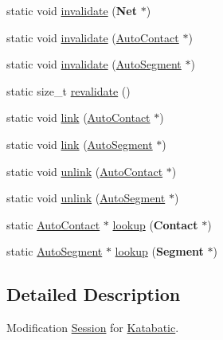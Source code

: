 \begin{DoxyCompactItemize}
\item 
static void \hyperlink{classKatabatic_1_1Session_ae310a7c2c301b7e5f90fba5d34cc5be9}{invalidate} ({\bf Net} $\ast$)
\item 
static void \hyperlink{classKatabatic_1_1Session_a1f8da0ae3a9d714c1dfae69904acec5f}{invalidate} (\hyperlink{classKatabatic_1_1AutoContact}{Auto\-Contact} $\ast$)
\item 
static void \hyperlink{classKatabatic_1_1Session_a7968875ccb5abb2c6f6d5dec92027550}{invalidate} (\hyperlink{classKatabatic_1_1AutoSegment}{Auto\-Segment} $\ast$)
\item 
static size\-\_\-t \hyperlink{classKatabatic_1_1Session_a4da9e28432c1fdb0c754717487d9cc83}{revalidate} ()
\item 
static void \hyperlink{classKatabatic_1_1Session_a8fad7191a9fc248f84e71cf1c9d0c6be}{link} (\hyperlink{classKatabatic_1_1AutoContact}{Auto\-Contact} $\ast$)
\item 
static void \hyperlink{classKatabatic_1_1Session_ab12ddab837097ec298ede4f66302b677}{link} (\hyperlink{classKatabatic_1_1AutoSegment}{Auto\-Segment} $\ast$)
\item 
static void \hyperlink{classKatabatic_1_1Session_a10c42636ea5786d898d530905ccb30d6}{unlink} (\hyperlink{classKatabatic_1_1AutoContact}{Auto\-Contact} $\ast$)
\item 
static void \hyperlink{classKatabatic_1_1Session_ab815a7824e0253142af6b8a204c361ec}{unlink} (\hyperlink{classKatabatic_1_1AutoSegment}{Auto\-Segment} $\ast$)
\item 
static \hyperlink{classKatabatic_1_1AutoContact}{Auto\-Contact} $\ast$ \hyperlink{classKatabatic_1_1Session_acc20c1f675cc59f9a0068aba727eca47}{lookup} ({\bf Contact} $\ast$)
\item 
static \hyperlink{classKatabatic_1_1AutoSegment}{Auto\-Segment} $\ast$ \hyperlink{classKatabatic_1_1Session_a6e465f0a592fee7e1e45b6c825b8a5da}{lookup} ({\bf Segment} $\ast$)
\end{DoxyCompactItemize}


\subsection{Detailed Description}
Modification \hyperlink{classKatabatic_1_1Session}{Session} for \hyperlink{namespaceKatabatic}{Katabatic}. 

